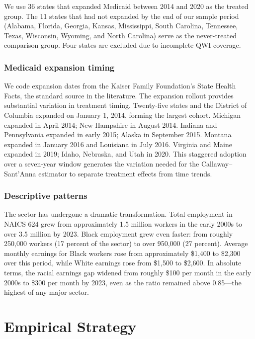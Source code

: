 \documentclass[12pt]{article}
\begin{document}
We use 36 states that expanded Medicaid between 2014 and 2020 as the treated group. The 11 states that had not expanded by the end of our sample period (Alabama, Florida, Georgia, Kansas, Mississippi, South Carolina, Tennessee, Texas, Wisconsin, Wyoming, and North Carolina) serve as the never-treated comparison group. Four states are excluded due to incomplete QWI coverage.

\subsubsection*{Medicaid expansion timing} We code expansion dates from the Kaiser Family Foundation's State Health Facts, the standard source in the literature. The expansion rollout provides substantial variation in treatment timing. Twenty-five states and the District of Columbia expanded on January 1, 2014, forming the largest cohort. Michigan expanded in April 2014; New Hampshire in August 2014. Indiana and Pennsylvania expanded in early 2015; Alaska in September 2015. Montana expanded in January 2016 and Louisiana in July 2016. Virginia and Maine expanded in 2019; Idaho, Nebraska, and Utah in 2020. This staggered adoption over a seven-year window generates the variation needed for the Callaway--Sant'Anna estimator to separate treatment effects from time trends.

\subsubsection*{Descriptive patterns} The sector has undergone a dramatic transformation. Total employment in NAICS 624 grew from approximately 1.5 million workers in the early 2000s to over 3.5 million by 2023. Black employment grew even faster: from roughly 250,000 workers (17 percent of the sector) to over 950,000 (27 percent). Average monthly earnings for Black workers rose from approximately \$1,400 to \$2,300 over this period, while White earnings rose from \$1,500 to \$2,600. In absolute terms, the racial earnings gap widened from roughly \$100 per month in the early 2000s to \$300 per month by 2023, even as the ratio remained above 0.85---the highest of any major sector.

\section{Empirical Strategy}
\end{document}
